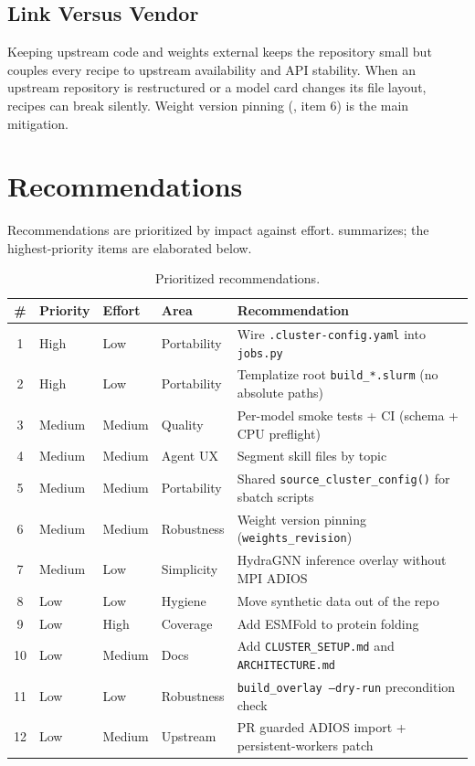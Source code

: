 \documentclass[11pt]{article}
\newcommand{\code}[1]{\texttt{#1}}
\newcommand{\file}[1]{\texttt{\small #1}}
\begin{document}
\subsection{Link Versus Vendor}
Keeping upstream code and weights external keeps the repository small but couples every
recipe to upstream availability and API stability. When an upstream repository is
restructured or a model card changes its file layout, recipes can break silently. Weight
version pinning (, item 6) is the main mitigation.

\section{Recommendations}
\label{sec:recommendations}

Recommendations are prioritized by impact against effort.  summarizes;
the highest-priority items are elaborated below.

\begin{table}[ht]
\centering
\footnotesize
\caption{Prioritized recommendations.}
\label{tab:recs}
\begin{tabular}{@{}clllp{6.4cm}@{}}
\toprule
\textbf{\#} & \textbf{Priority} & \textbf{Effort} & \textbf{Area} & \textbf{Recommendation} \\
\midrule
1  & High   & Low    & Portability & Wire \file{.cluster-config.yaml} into \file{jobs.py} \\
2  & High   & Low    & Portability & Templatize root \file{build\_*.slurm} (no absolute paths) \\
3  & Medium & Medium & Quality     & Per-model smoke tests + CI (schema + CPU preflight) \\
4  & Medium & Medium & Agent UX    & Segment skill files by topic \\
5  & Medium & Medium & Portability & Shared \code{source\_cluster\_config()} for sbatch scripts \\
6  & Medium & Medium & Robustness  & Weight version pinning (\code{weights\_revision}) \\
7  & Medium & Low    & Simplicity  & HydraGNN inference overlay without MPI ADIOS \\
8  & Low    & Low    & Hygiene     & Move synthetic data out of the repo \\
9  & Low    & High   & Coverage    & Add ESMFold to protein folding \\
10 & Low    & Medium & Docs        & Add \file{CLUSTER\_SETUP.md} and \file{ARCHITECTURE.md} \\
11 & Low    & Low    & Robustness  & \code{build\_overlay --dry-run} precondition check \\
12 & Low    & Medium & Upstream    & PR guarded ADIOS import + persistent-workers patch \\
\bottomrule
\end{tabular}
\end{table}
\end{document}

